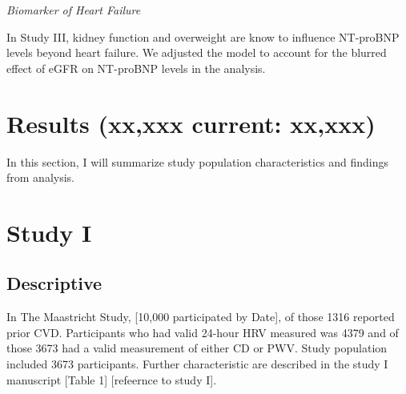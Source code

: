 \documentclass[
  a4paper,
  headsepline=true,
  open=any]{scrbook}
\begin{document}
\emph{Biomarker of Heart Failure}

In Study III, kidney function and overweight are know to influence
NT-proBNP levels beyond heart failure. We adjusted the model to account
for the blurred effect of eGFR on NT-proBNP levels in the analysis.


\hypertarget{results-xxxxx-current-xxxxx}{%
\chapter{Results (xx,xxx current:
xx,xxx)}\label{results-xxxxx-current-xxxxx}}

In this section, I will summarize study population characteristics and
findings from analysis.


\hypertarget{study-i}{%
\chapter{Study I}\label{study-i}}

\hypertarget{descriptive}{%
\section{Descriptive}\label{descriptive}}

In The Maastricht Study, {[}10,000 participated by Date{]}, of those
1316 reported prior CVD. Participants who had valid 24-hour HRV measured
was 4379 and of those 3673 had a valid measurement of either CD or PWV.
Study population included 3673 participants. Further characteristic are
described in the study I manuscript {[}Table 1{]} {[}refeernce to study
I{]}.
\end{document}
